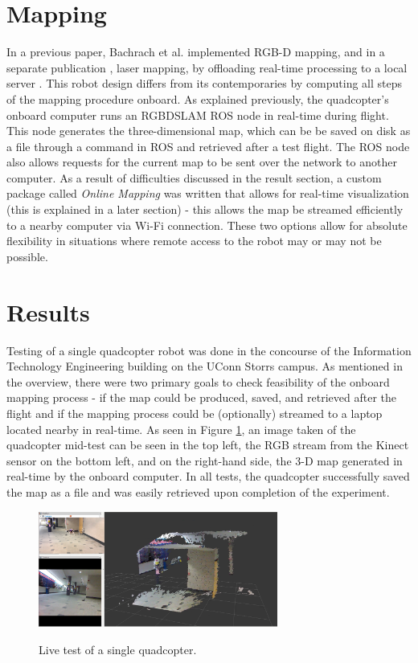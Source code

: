 \documentclass[letterpaper, oneside, 10pt]{report}
\begin{document}
\section{Mapping}
In a previous paper, Bachrach et al. implemented RGB-D mapping, and in a separate publication \cite{bachrach2011range}, laser mapping, by offloading real-time processing to a local server \cite{bachrach2012estimation}.  This robot design differs from its contemporaries by computing all steps of the mapping procedure onboard. As explained previously, the quadcopter's onboard computer runs an RGBDSLAM ROS node in real-time during flight. This node generates the three-dimensional map, which can be be saved on disk as a file through a command in ROS and retrieved after a test flight. The ROS node also allows requests for the current map to be sent over the network to another computer. As a result of difficulties discussed in the result section, a custom package called \textsl{Online Mapping} was written that allows for real-time visualization (this is explained in a later section) - this allows the map be streamed efficiently to a nearby computer via Wi-Fi connection. These two options allow for absolute flexibility in situations where remote access to the robot may or may not be possible.

\section{Results}
Testing of a single quadcopter robot was done in the concourse of the Information Technology Engineering building on the UConn Storrs campus. As mentioned in the overview, there were two primary goals to check feasibility of the onboard mapping process - if the map could be produced, saved, and retrieved after the flight and if the mapping process could be (optionally) streamed to a laptop located nearby in real-time. As seen in Figure \ref{fig: single test.}, an image taken of the quadcopter mid-test can be seen in the top left, the RGB stream from the Kinect sensor on the bottom left, and on the right-hand side, the 3-D map generated in real-time by the onboard computer. In all tests, the quadcopter successfully saved the map as a file and was easily retrieved upon completion of the experiment.

\begin{figure}[h]
 \caption{Live test of a single quadcopter.}
 \centering
   \includegraphics[width=0.7\textwidth]{images/single_test}
 \label{fig: single test.}
\end{figure}
\end{document}

